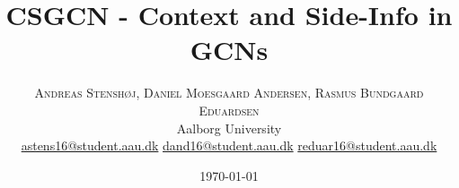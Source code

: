 %
%
%
%




\setlength{\droptitle}{-4\baselineskip} %

\pretitle{\begin{center}\Huge\bfseries} %
\posttitle{\end{center}} %
\title{CSGCN - Context and Side-Info in GCNs} %
\author{%
\textsc{Andreas Stenshøj, Daniel Moesgaard Andersen, Rasmus Bundgaard Eduardsen} \\[1ex] %
\normalsize Aalborg University \\ %
\normalsize \href{mailto:astens16@student.aau.dk}{astens16@student.aau.dk} %
\normalsize \href{mailto:dand16@student.aau.dk}{dand16@student.aau.dk} %
\normalsize \href{mailto:reduar16@student.aau.dk}{reduar16@student.aau.dk} %
}
\date{\today} %
\renewcommand{\maketitlehookd}{%
\begin{abstract}
\noindent Graph-convolutional neural networks are growing increasingly popular, but most of them limit themselves to simply considering user-item interactions, even though additional information is often available in datasets.
In this paper, we present two ways to incorporate side-information and contextual information into the prediction model of a graph-convolutional neural network.
Including this additional information allows us to not only improve density of the graph structure, but also to generate recommendations for a specific context that the user is currently in.
\todo{Improver vi? Hovr mange procent? Laver vi eksperimenter? Hvad er konklusionen}
\end{abstract}
}

